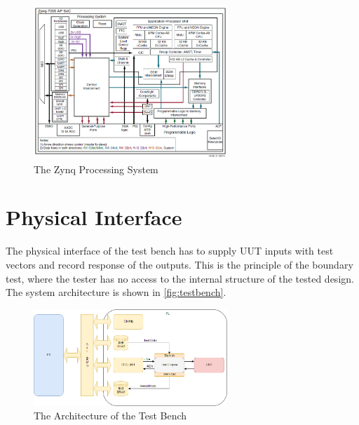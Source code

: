 \begin{figure}[H]
\centering
\includegraphics[width=0.65\textwidth]{figures/Zynq.png}
\caption{The Zynq Processing System~\cite{book:ZynqBook}}
\label{fig:Zynq}
\end{figure}

\section{Physical Interface}
The physical interface of the test bench has to supply UUT inputs with test vectors and record response of the outputs. This is the principle of the boundary test, where the tester has no access to the internal structure of the tested design. The system architecture is shown in \autoref{fig:testbench}.

\begin{figure}[H]
\centering
\includegraphics[width=0.65\textwidth]{figures/TestBench.png}
\caption{The Architecture of the Test Bench~\cite{book:ZynqBook}}
\label{fig:testbench}
\end{figure}

